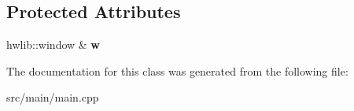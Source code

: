 \subsection*{Protected Attributes}
\begin{DoxyCompactItemize}
\item 
\mbox{\label{classdrawable_a20e9cd0e0234818001bd279a2d37cf75}} 
hwlib\+::window \& {\bfseries w}
\end{DoxyCompactItemize}


The documentation for this class was generated from the following file\+:\begin{DoxyCompactItemize}
\item 
src/main/main.\+cpp\end{DoxyCompactItemize}
